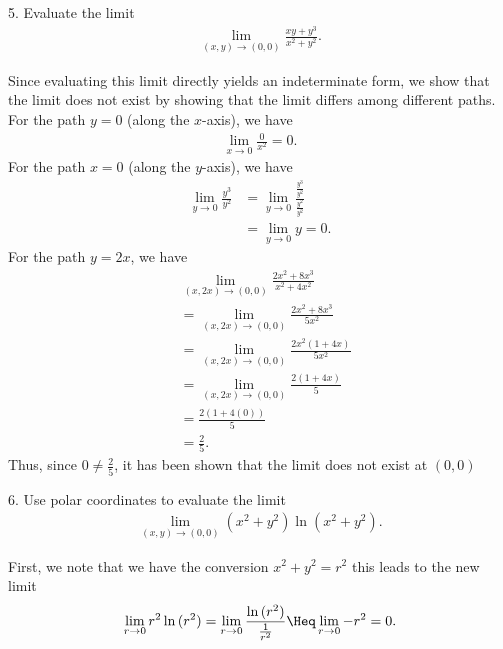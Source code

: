 \documentclass{report}
\begin{document}
    \bigbreak \noindent 
    \begin{mdframed}
        5. Evaluate the limit
        \begin{align*}
            \lim\limits_{(x,y) \to (0,0)}{\frac{xy + y^{3}}{x^{2} + y^{2}}}
        .\end{align*}
    \end{mdframed}
    \bigbreak \noindent 
    Since evaluating this limit directly yields an indeterminate form, we show that the limit does not exist by showing that the limit differs among different paths.
    \bigbreak \noindent 
    For the path $y=0$ (along the $x$-axis), we have
    \begin{align*}
        \lim\limits_{x \to 0}{\frac{0}{x^{2}}} = 0
    .\end{align*}
    \bigbreak \noindent 
        For the path $x=0$ (along the $y$-axis), we have
        \begin{align*}
            \lim\limits_{y \to 0}{\frac{y^{3}}{y^{2}}} &= \lim\limits_{y \to 0}{\frac{\frac{y^{3}}{y^{2}}}{\frac{y^{2}}{y^{2}}}} \\
            &=\lim\limits_{y \to 0}{y} = 0
        .\end{align*}
        For the path $y=2x$, we have
        \begin{align*}
            &\lim\limits_{(x,2x) \to (0,0)}{\frac{2x^{2} + 8x^{3}}{x^{2} + 4x^{2}}} \\
            &=\lim\limits_{(x,2x) \to (0,0)}{\frac{2x^{2} + 8x^{3}}{5x^{2}}} \\
            &=\lim\limits_{(x,2x) \to (0,0)}{\frac{2x^{2}(1+4x)}{5x^{2}}} \\
            &=\lim\limits_{(x,2x) \to (0,0)}{\frac{2(1+4x)}{5}}  \\
            &=\frac{2(1+4(0))}{5} \\
            &=\frac{2}{5}
        .\end{align*}
        \bigbreak \noindent 
        Thus, since $0 \neq \frac{2}{5}$, it has been shown that the limit does not exist at $(0,0)$
        \bigbreak \noindent 
        \begin{mdframed}
            6.  Use polar coordinates to evaluate the limit
            \begin{align*}
                \lim_{(x,y) \to (0,0)} (x^2 + y^2) \ln(x^2 + y^2)
            .\end{align*}
        \end{mdframed}
        \bigbreak \noindent 
        First, we note that we have the conversion $x^{2} + y^{2} = r^{2}$ this leads to the new limit
        \begin{align*}
            \lim\limits_{r \to 0}{r^{2}\ln{(r^{2})}} = \lim\limits_{r \to 0}{\frac{\ln{(r^{2})}}{\frac{1}{r^{2}}}} \Heq \lim\limits_{r \to 0}{-r^{2}} = 0
        .\end{align*}
\end{document}
